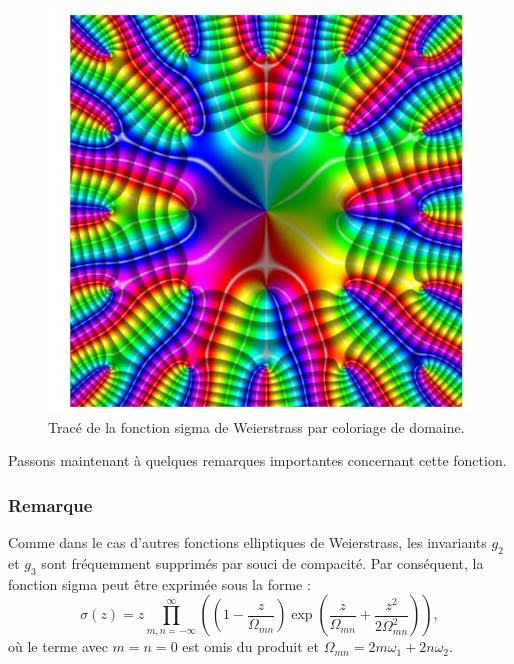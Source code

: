 \documentclass[12pt]{article}
\begin{document}
                        \begin{figure}
                            \centering
                            \includegraphics[width=\linewidth]{sigma_function.jpeg}
                            \caption{Tracé de la fonction sigma de Weierstrass par coloriage de domaine.}
                        \end{figure}
                        \newpage
                        Passons maintenant à quelques remarques importantes concernant cette fonction.

                        \subsubsection{Remarque}


                        Comme dans le cas d'autres fonctions elliptiques de Weierstrass, les invariants $g_2$ et $g_3$ sont fréquemment supprimés par souci de compacité. Par conséquent, la fonction sigma peut être exprimée sous la forme :
                        \[
                        \sigma (z) = z \prod_{m,n=-\infty}^{\infty} \left( \left( 1 - \frac{z}{\Omega_{mn}} \right) \exp \left( \frac{z}{\Omega_{mn}} + \frac{z^2}{2 \Omega_{mn}^2} \right) \right), \tag{3}
                        \]
                        où le terme avec $m = n = 0$ est omis du produit et $\Omega_{mn} = 2 m \omega_1 + 2 n \omega_2$.
\end{document}
